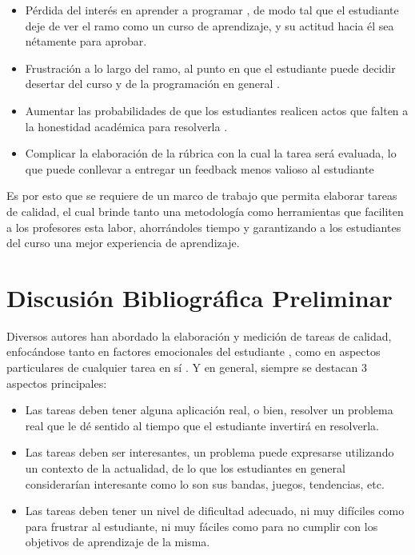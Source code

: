 \documentclass[conference]{IEEEtran}
\begin{document}
\begin{itemize}
    \item Pérdida del interés en aprender a programar \cite{10.1145/1227504.1227466}, de modo tal que el estudiante deje de ver el ramo como un curso de aprendizaje, y su actitud hacia él sea nétamente para aprobar.
    \item Frustración a lo largo del ramo, al punto en que el estudiante puede decidir desertar del curso y de la programación en general \cite{10.1145/2526968.2526982}.
    \item Aumentar las probabilidades de que los estudiantes realicen actos que falten a la honestidad académica para resolverla \cite{10.1145/3013499.3013507}.
    \item Complicar la elaboración de la rúbrica con la cual la tarea será evaluada, lo que puede conllevar a entregar un feedback menos valioso al estudiante 
\end{itemize}

Es por esto que se requiere de un marco de trabajo que permita elaborar tareas de calidad, el cual brinde tanto una metodología como herramientas que faciliten a los profesores esta labor, ahorrándoles tiempo y garantizando a los estudiantes del curso una mejor experiencia de aprendizaje.

\section{Discusión Bibliográfica Preliminar}

Diversos autores han abordado la elaboración y medición de tareas de calidad, enfocándose tanto en factores emocionales del estudiante \cite{10.1145/1839594.1839609, 10.1145/1227504.1227466, 10.5555/1968521.1968545, 10.1145/2526968.2526982}, como en aspectos particulares de cualquier tarea en sí \cite{texasU, 10.1145/2676723.2677276, 10.1145/1140124.1140167}. Y en general, siempre se destacan 3 aspectos principales:

\begin{itemize}
    \item Las tareas deben tener alguna aplicación real, o bien, resolver un problema real que le dé sentido al tiempo que el estudiante invertirá en resolverla.
    \item Las tareas deben ser interesantes, un problema puede expresarse utilizando un contexto de la actualidad, de lo que los estudiantes en general considerarían interesante como lo son sus bandas, juegos, tendencias, etc.
    \item Las tareas deben tener un nivel de dificultad adecuado, ni muy difíciles como para frustrar al estudiante, ni muy fáciles como para no cumplir con los objetivos de aprendizaje de la misma.
\end{itemize}
\end{document}
